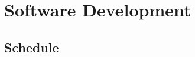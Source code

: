 \chapter{Software Development}
\label{chap:software-development}




\section{Schedule}
\label{section:schedule}

